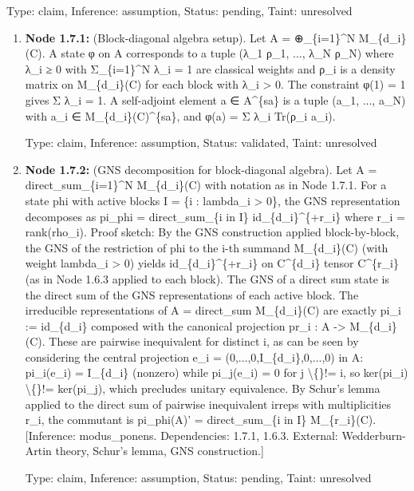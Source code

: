 \documentclass{article}
\begin{document}
\begin{enumerate}
  Type: claim, Inference: assumption, Status: pending, Taint: unresolved

\begin{enumerate}
\item \textbf{Node 1.7.1:} (Block-diagonal algebra setup). Let A = ⊕\_\{i=1\}\textasciicircum{}N M\_\{d\_i\}(C). A state φ on A corresponds to a tuple (λ\_1 ρ\_1, ..., λ\_N ρ\_N) where λ\_i ≥ 0 with Σ\_\{i=1\}\textasciicircum{}N λ\_i = 1 are classical weights and ρ\_i is a density matrix on M\_\{d\_i\}(C) for each block with λ\_i > 0. The constraint φ(1) = 1 gives Σ λ\_i = 1. A self-adjoint element a ∈ A\textasciicircum{}\{sa\} is a tuple (a\_1, ..., a\_N) with a\_i ∈ M\_\{d\_i\}(C)\textasciicircum{}\{sa\}, and φ(a) = Σ λ\_i Tr(ρ\_i a\_i).

  Type: claim, Inference: assumption, Status: validated, Taint: unresolved

\item \textbf{Node 1.7.2:} (GNS decomposition for block-diagonal algebra). Let A = direct\_sum\_\{i=1\}\textasciicircum{}N M\_\{d\_i\}(C) with notation as in Node 1.7.1. For a state phi with active blocks I = \{i : lambda\_i > 0\}, the GNS representation decomposes as pi\_phi = direct\_sum\_\{i in I\} id\_\{d\_i\}\textasciicircum{}\{+r\_i\} where r\_i = rank(rho\_i). Proof sketch: By the GNS construction applied block-by-block, the GNS of the restriction of phi to the i-th summand M\_\{d\_i\}(C) (with weight lambda\_i > 0) yields id\_\{d\_i\}\textasciicircum{}\{+r\_i\} on C\textasciicircum{}\{d\_i\} tensor C\textasciicircum{}\{r\_i\} (as in Node 1.6.3 applied to each block). The GNS of a direct sum state is the direct sum of the GNS representations of each active block. The irreducible representations of A = direct\_sum M\_\{d\_i\}(C) are exactly pi\_i := id\_\{d\_i\} composed with the canonical projection pr\_i : A -> M\_\{d\_i\}(C). These are pairwise inequivalent for distinct i, as can be seen by considering the central projection e\_i = (0,...,0,I\_\{d\_i\},0,...,0) in A: pi\_i(e\_i) = I\_\{d\_i\} (nonzero) while pi\_j(e\_i) = 0 for j \textbackslash\{\}!= i, so ker(pi\_i) \textbackslash\{\}!= ker(pi\_j), which precludes unitary equivalence. By Schur's lemma applied to the direct sum of pairwise inequivalent irreps with multiplicities r\_i, the commutant is pi\_phi(A)' = direct\_sum\_\{i in I\} M\_\{r\_i\}(C). [Inference: modus\_ponens. Dependencies: 1.7.1, 1.6.3. External: Wedderburn-Artin theory, Schur's lemma, GNS construction.]

  Type: claim, Inference: assumption, Status: pending, Taint: unresolved


\end{enumerate}
\end{enumerate}
\end{document}
